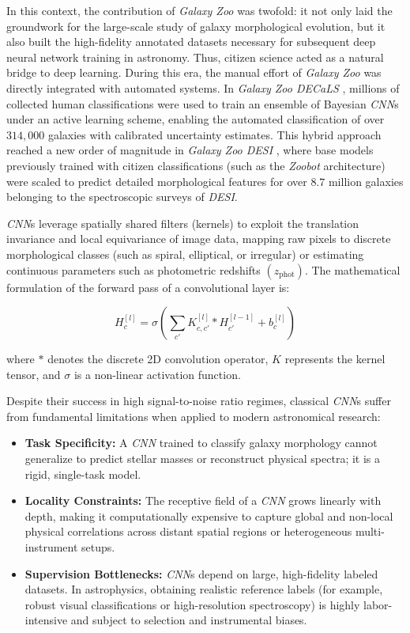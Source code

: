 In this context, the contribution of \textit{Galaxy Zoo} was twofold: it not only laid the groundwork for the large-scale study of galaxy morphological evolution, but it also built the high-fidelity annotated datasets necessary for subsequent deep neural network training in astronomy. Thus, citizen science acted as a natural bridge to deep learning. During this era, the manual effort of \textit{Galaxy Zoo} was directly integrated with automated systems. In \textit{Galaxy Zoo DECaLS} \autocite{ar:walmsley-2022}, millions of collected human classifications were used to train an ensemble of Bayesian \textit{\gls{CNN}}s under an active learning scheme, enabling the automated classification of over $314,000$ galaxies with calibrated uncertainty estimates. This hybrid approach reached a new order of magnitude in \textit{Galaxy Zoo DESI} \autocite{ar:walmsley-2023}, where base models previously trained with citizen classifications (such as the \textit{Zoobot} architecture) were scaled to predict detailed morphological features for over $8.7$ million galaxies belonging to the spectroscopic surveys of \textit{\gls{DESI}}.

\textit{\gls{CNN}}s leverage spatially shared filters (kernels) to exploit the translation invariance and local equivariance of image data, mapping raw pixels to discrete morphological classes (such as spiral, elliptical, or irregular) or estimating continuous parameters such as photometric redshifts $\left(z_{\text{phot}}\right)$. The mathematical formulation of the forward pass of a convolutional layer is:

\begin{equation}
  H^{[l]}_{c} = \sigma \left( \sum_{c'} K^{[l]}_{c, c'} * H^{[l-1]}_{c'} + b^{[l]}_c \right)
  \label{eq:convolucion_2d}
\end{equation}

where $*$ denotes the discrete 2D convolution operator, $K$ represents the kernel tensor, and $\sigma$ is a non-linear activation function.

Despite their success in high signal-to-noise ratio regimes, classical \textit{\gls{CNN}}s suffer from fundamental limitations when applied to modern astronomical research:

\begin{itemize}
  \item \textbf{Task Specificity:} A \textit{\gls{CNN}} trained to classify galaxy morphology cannot generalize to predict stellar masses or reconstruct physical spectra; it is a rigid, single-task model.
  \item \textbf{Locality Constraints:} The receptive field of a \textit{\gls{CNN}} grows linearly with depth, making it computationally expensive to capture global and non-local physical correlations across distant spatial regions or heterogeneous multi-instrument setups.
  \item \textbf{Supervision Bottlenecks:} \textit{\gls{CNN}}s depend on large, high-fidelity labeled datasets. In astrophysics, obtaining realistic reference labels (for example, robust visual classifications or high-resolution spectroscopy) is highly labor-intensive and subject to selection and instrumental biases.
\end{itemize}

